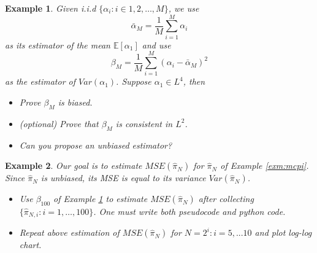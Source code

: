 \documentclass{article}
\newtheorem{example}{Example}
\begin{document}
\begin{example} \label{exm:mse}
 Given i.i.d $\{\alpha_i: i\in 1, 2, \ldots, M\}$, we use 
$$\bar \alpha_M = \frac 1 M \sum_{i=1}^M \alpha_i$$
as its estimator of the mean $\mathbb E[\alpha_1]$ 
and use
$$\beta_M = \frac 1 M \sum_{i=1}^M (\alpha_i -\bar \alpha_M)^2$$
as the estimator of $Var(\alpha_1)$. Suppose $\alpha_1\in L^4$, then 
\begin{itemize}
 \item Prove $\beta_M$ is biased.
 \item (optional) Prove that $\beta_M$ is consistent in $L^2$.
 \item Can you propose an unbiased estimator?
 \end{itemize}
\end{example}
\begin{example}
Our goal is to estimate $MSE(\hat \pi_{N})$ for $\hat \pi_{N}$ of Example \ref{exm:mcpi}. Since $\hat \pi_{N}$ is unbiased, its MSE is equal to its variance $Var(\hat \pi_{N})$.
\begin{itemize}
 \item Use $\beta_{100}$ of Example \ref{exm:mse} to estimate 
 $MSE(\hat \pi_{N})$ after collecting $\{\hat \pi_{N, i}: i= 1,\ldots,100\}$. 
 One must write both pseudocode and python code.
 \item Repeat above estimation of $MSE(\hat \pi_{N})$ for $N= 2^{i}: i = 5, ...10$ and plot log-log chart.
\end{itemize}
 
\end{example}
\end{document}
